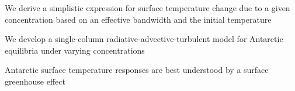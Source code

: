 \documentclass[draft]{agujournal2019}
\begin{document}



\begin{keypoints}
\item We derive a simplistic expression for surface temperature change due to a given  concentration based on an effective bandwidth and the initial temperature
\item We develop a single-column radiative-advective-turbulent model for Antarctic equilibria under varying  concentrations 
\item Antarctic surface temperature responses are best understood by a surface greenhouse effect
\end{keypoints}

%
%

%
%

\end{document}
